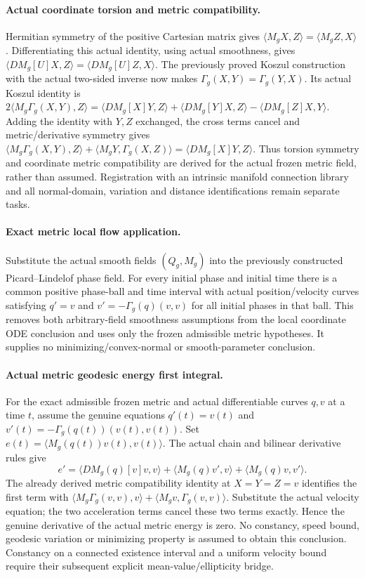 \documentclass[11pt]{article}
\theoremstyle{definition}
\theoremstyle{remark}
\numberwithin{equation}{section}
\begin{document}
\paragraph{Actual coordinate torsion and metric compatibility.}
Hermitian symmetry of the positive Cartesian matrix gives
$\langle M_gX,Z\rangle=\langle M_gZ,X\rangle$.
Differentiating this actual identity, using actual smoothness, gives
$\langle DM_g[U]X,Z\rangle=\langle DM_g[U]Z,X\rangle$.
The previously proved Koszul construction with the actual two-sided
inverse now makes $\Gamma_g(X,Y)=\Gamma_g(Y,X)$.
Its actual Koszul identity is
$2\langle M_g\Gamma_g(X,Y),Z\rangle=
\langle DM_g[X]Y,Z\rangle+\langle DM_g[Y]X,Z\rangle-
\langle DM_g[Z]X,Y\rangle$.
Adding the identity with $Y,Z$ exchanged, the cross terms cancel and
metric/derivative symmetry gives
$\langle M_g\Gamma_g(X,Y),Z\rangle+
\langle M_gY,\Gamma_g(X,Z)\rangle=\langle DM_g[X]Y,Z\rangle$.
Thus torsion symmetry and coordinate metric compatibility are derived
for the actual frozen metric field, rather than assumed. Registration
with an intrinsic manifold connection library and all normal-domain,
variation and distance identifications remain separate tasks.

\paragraph{Exact metric local flow application.}
Substitute the actual smooth fields $(Q_g,M_g)$ into the previously
constructed Picard--Lindelof phase field. For every initial phase and
initial time there is a common positive phase-ball and time interval
with actual position/velocity curves satisfying $q'=v$ and
$v'=-\Gamma_g(q)(v,v)$ for all initial phases in that ball. This removes
both arbitrary-field smoothness assumptions from the local coordinate
ODE conclusion and uses only the frozen admissible metric hypotheses.
It supplies no minimizing/convex-normal or smooth-parameter conclusion.


\paragraph{Actual metric geodesic energy first integral.}
For the exact admissible frozen metric and actual differentiable curves
$q,v$ at a time $t$, assume the genuine equations
$q'(t)=v(t)$ and $v'(t)=-\Gamma_g(q(t))(v(t),v(t))$.
Set $e(t)=\langle M_g(q(t))v(t),v(t)\rangle$.
The actual chain and bilinear derivative rules give
\[
 e'=\langle DM_g(q)[v]v,v\rangle
 +\langle M_g(q)v',v\rangle+\langle M_g(q)v,v'\rangle.
\]
The already derived metric compatibility identity at $X=Y=Z=v$
identifies the first term with
$\langle M_g\Gamma_g(v,v),v\rangle+
\langle M_gv,\Gamma_g(v,v)\rangle$.
Substitute the actual velocity equation; the two acceleration terms
cancel these two terms exactly. Hence the genuine derivative of the
actual metric energy is zero. No constancy, speed bound, geodesic
variation or minimizing property is assumed to obtain this conclusion.
Constancy on a connected existence interval and a uniform velocity
bound require their subsequent explicit mean-value/ellipticity bridge.
\end{document}
